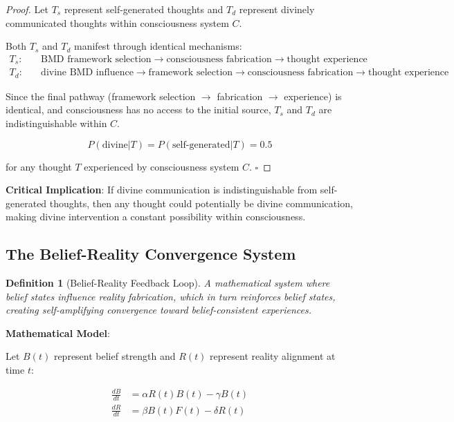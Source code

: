 \documentclass[12pt,a4paper]{article}
\newtheorem{definition}[theorem]{Definition}
\begin{document}
\begin{proof}
Let $T_s$ represent self-generated thoughts and $T_d$ represent divinely communicated thoughts within consciousness system $C$.

Both $T_s$ and $T_d$ manifest through identical mechanisms:
\begin{align}
T_s: &\quad \text{BMD framework selection} \rightarrow \text{consciousness fabrication} \rightarrow \text{thought experience}\\
T_d: &\quad \text{divine BMD influence} \rightarrow \text{framework selection} \rightarrow \text{consciousness fabrication} \rightarrow \text{thought experience}
\end{align}

Since the final pathway (framework selection $\rightarrow$ fabrication $\rightarrow$ experience) is identical, and consciousness has no access to the initial source, $T_s$ and $T_d$ are indistinguishable within $C$.

$$P(\text{divine}|T) = P(\text{self-generated}|T) = 0.5$$

for any thought $T$ experienced by consciousness system $C$. $\square$
\end{proof}

\textbf{Critical Implication}: If divine communication is indistinguishable from self-generated thoughts, then any thought could potentially be divine communication, making divine intervention a constant possibility within consciousness.

\subsection{The Belief-Reality Convergence System}

\begin{definition}[Belief-Reality Feedback Loop]
A mathematical system where belief states influence reality fabrication, which in turn reinforces belief states, creating self-amplifying convergence toward belief-consistent experiences.
\end{definition}

\textbf{Mathematical Model}:

Let $B(t)$ represent belief strength and $R(t)$ represent reality alignment at time $t$:

\begin{align}
\frac{dB}{dt} &= \alpha R(t) B(t) - \gamma B(t)\\
\frac{dR}{dt} &= \beta B(t) F(t) - \delta R(t)
\end{align}
\end{document}

